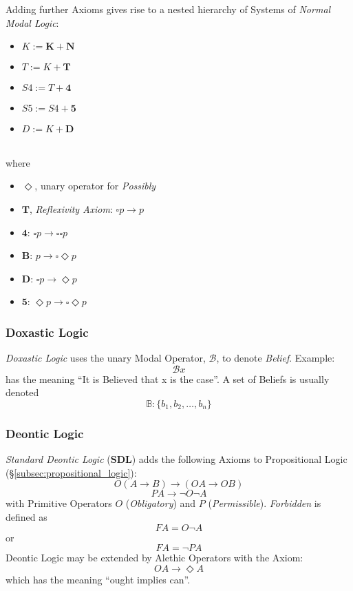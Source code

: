 \documentclass{article}
\begin{document}
Adding further Axioms gives rise to a nested hierarchy of Systems of
\emph{Normal Modal Logic}:

\begin{itemize}
\item $K := \mathbf{K} + \mathbf{N}$
\item $T := K + \mathbf{T}$
\item $S4 := T + \mathbf{4}$
\item $S5 := S4 + \mathbf{5}$
\item $D := K + \mathbf{D}$
\end{itemize} \hfill \\
where

\begin{itemize}
\item $\Diamond$, unary operator for \emph{Possibly}
\item $\mathbf{T}$, \emph{Reflexivity Axiom}: $\square p \rightarrow p$
\item $\mathbf{4}$: $\square p \rightarrow \square \square p$
\item $\mathbf{B}$: $p \rightarrow \square \Diamond p$
\item $\mathbf{D}$: $\square p \rightarrow \Diamond p$
\item $\mathbf{5}$: $\Diamond p \rightarrow \square \Diamond p$
\end{itemize}

\subsubsection{Doxastic Logic}

\emph{Doxastic Logic} uses the unary Modal Operator, $\mathcal{B}$, to
denote \emph{Belief}. Example:
\[
    \mathcal{B} x
\]
has the meaning ``It is Believed that x is the case''. A set of
Beliefs is usually denoted
\[
    \mathbb{B}: \{ b_1, b_2, \ldots, b_n \}
\]

\subsubsection{Deontic Logic}

\emph{Standard Deontic Logic} ($\mathbf{SDL}$) adds the following
Axioms to Propositional Logic (\S\ref{subsec:propositional_logic}):
    \[O(A \rightarrow B) \rightarrow (OA \rightarrow OB)\]
    \[PA \rightarrow \neg O \neg A\]
with Primitive Operators $O$ (\emph{Obligatory}) and $P$
(\emph{Permissible}). \emph{Forbidden} is defined as
    \[FA = O \neg A\]
or
    \[FA = \neg P A\]
Deontic Logic may be extended by Alethic Operators with the Axiom:
    \[OA \rightarrow \Diamond A\]
which has the meaning ``ought implies can''.
\end{document}
